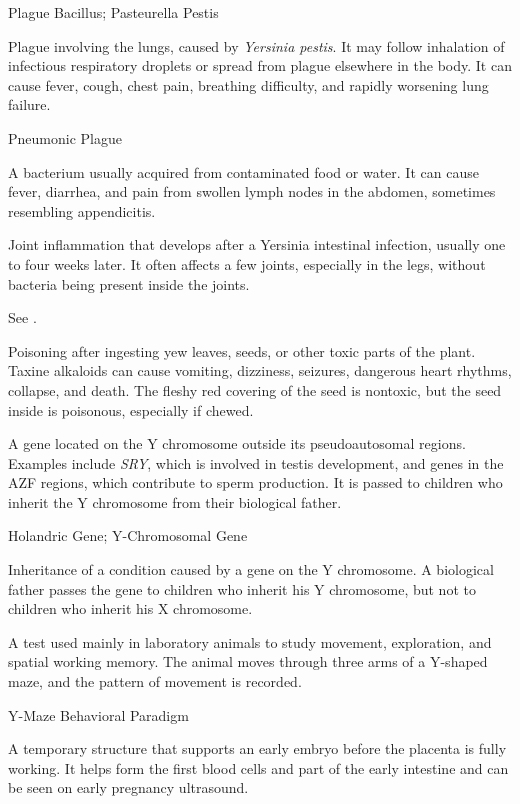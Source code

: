\synonyms
Plague Bacillus; Pasteurella Pestis

 Plague involving the lungs, caused by \textit{Yersinia pestis}. It may follow inhalation of infectious respiratory droplets or spread from plague elsewhere in the body. It can cause fever, cough, chest pain, breathing difficulty, and rapidly worsening lung failure.

\synonyms
Pneumonic Plague

 A bacterium usually acquired from contaminated food or water. It can cause fever, diarrhea, and pain from swollen lymph nodes in the abdomen, sometimes resembling appendicitis.

 Joint inflammation that develops after a Yersinia intestinal infection, usually one to four weeks later. It often affects a few joints, especially in the legs, without bacteria being present inside the joints.

 See .

 Poisoning after ingesting yew leaves, seeds, or other toxic parts of the plant. Taxine alkaloids can cause vomiting, dizziness, seizures, dangerous heart rhythms, collapse, and death. The fleshy red covering of the seed is nontoxic, but the seed inside is poisonous, especially if chewed.

 A gene located on the Y chromosome outside its pseudoautosomal regions. Examples include \textit{SRY}, which is involved in testis development, and genes in the AZF regions, which contribute to sperm production. It is passed to children who inherit the Y chromosome from their biological father.

\synonyms
Holandric Gene; Y-Chromosomal Gene

 Inheritance of a condition caused by a gene on the Y chromosome. A biological father passes the gene to children who inherit his Y chromosome, but not to children who inherit his X chromosome.

 A test used mainly in laboratory animals to study movement, exploration, and spatial working memory. The animal moves through three arms of a Y-shaped maze, and the pattern of movement is recorded.

\synonyms
Y-Maze Behavioral Paradigm

 A temporary structure that supports an early embryo before the placenta is fully working. It helps form the first blood cells and part of the early intestine and can be seen on early pregnancy ultrasound.

